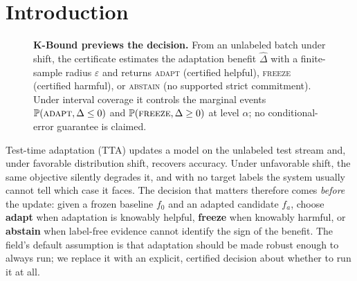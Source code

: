 \section{Introduction}\label{sec:intro}
\begin{figure}[t]\centering
{}
\caption{\textbf{K-Bound previews the decision.} From an unlabeled batch under shift, the certificate
estimates the adaptation benefit $\widehat\Delta$ with a finite-sample radius $\varepsilon$ and returns
\textsc{adapt} (certified helpful), \textsc{freeze} (certified harmful), or \textsc{abstain} (no
supported strict commitment). Under interval coverage it controls the marginal events
$\Pr(\textsc{adapt},\Delta\le0)$ and $\Pr(\textsc{freeze},\Delta\ge0)$ at level $\alpha$; no
conditional-error guarantee is claimed.}
\label{fig:teaser}
\end{figure}
Test-time adaptation (TTA) updates a model on the unlabeled test stream and, under favorable
distribution shift, recovers accuracy. Under unfavorable shift, the same objective silently
degrades it, and with no target labels the system usually cannot tell which case it faces.
The decision that matters therefore comes \emph{before} the update: given a frozen
baseline $f_0$ and an adapted candidate $f_a$, choose
\textbf{adapt} when adaptation is knowably helpful, \textbf{freeze} when knowably harmful, or
\textbf{abstain} when label-free evidence cannot identify the sign of the benefit. The field's
default assumption is that adaptation should be made robust enough to always run; we replace it
with an explicit, certified decision about whether to run it at all.

